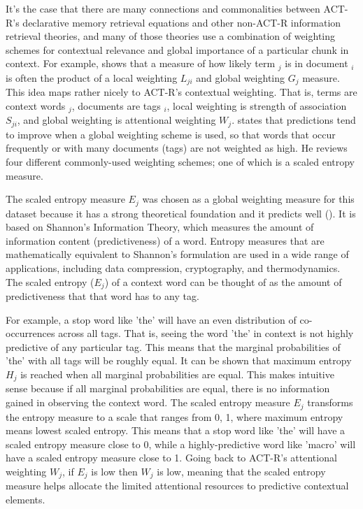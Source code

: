 \documentclass[10pt,letterpaper]{article}
\begin{document}
It's the case that there are many connections and commonalities between ACT-R's declarative memory retrieval equations and other non-ACT-R information retrieval theories,
and many of those theories use a combination of weighting schemes for contextual relevance and global importance of a particular chunk in context.
For example,  shows that a measure of how likely term ${_j}$ is in document ${_i}$ is often the product of a local weighting $L_{ji}$ and global weighting $G_{j}$ measure.
This idea maps rather nicely to ACT-R's contextual weighting.
That is, terms are context words ${_j}$, documents are tags ${_i}$, local weighting is strength of association $S_{ji}$, and global weighting is attentional weighting $W_{j}$.
 states that predictions tend to improve when a global weighting scheme is used, so that words that occur frequently or with many documents (tags) are not weighted as high.
He reviews four different commonly-used weighting schemes; one of which is a scaled entropy measure.

The scaled entropy measure $E_{j}$ was chosen as a global weighting measure for this dataset because it has a strong theoretical foundation and it predicts well ().
It is based on Shannon's Information Theory, which measures the amount of information content (predictiveness) of a word.
Entropy measures that are mathematically equivalent to Shannon's formulation are used in a wide range of applications, including data compression, cryptography, and thermodynamics.
The scaled entropy ($E_{j}$) of a context word can be thought of as the amount of predictiveness that that word has to any tag.

For example, a stop word like 'the' will have an even distribution of co-occurrences across all tags.
That is, seeing the word 'the' in context is not highly predictive of any particular tag.
This means that the marginal probabilities of 'the' with all tags will be roughly equal.
It can be shown that maximum entropy $H_{j}$ is reached when all marginal probabilities are equal.
This makes intuitive sense because if all marginal probabilities are equal, there is no information gained in observing the context word.
The scaled entropy measure $E_{j}$ transforms the entropy measure to a scale that ranges from 0, 1, where maximum entropy means lowest scaled entropy.
This means that a stop word like 'the' will have a scaled entropy measure close to 0, while a highly-predictive word like 'macro' will have a scaled entropy measure close to 1.
Going back to ACT-R's attentional weighting $W_{j}$, if $E_{j}$ is low then $W_{j}$ is low, meaning that the scaled entropy measure helps allocate the limited attentional resources to predictive contextual elements.
\end{document}
